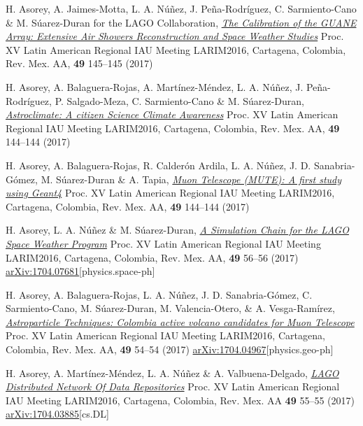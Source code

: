 \begin{etaremune}
\item {} H. Asorey, A. Jaimes-Motta, L. A. Núñez, J. Peña-Rodríguez, C. Sarmiento-Cano \& M. Súarez-Duran for the LAGO Collaboration, \href{http://www.astroscu.unam.mx/rmaa/RMxAC..49/PDF/RMxAC..49\_poster3.pdf}{\emph{The Calibration of the GUANE Array: Extensive Air Showers Reconstruction and Space Weather Studies}} \en Proc. XV Latin American Regional IAU Meeting LARIM2016, Cartagena, Colombia, Rev. Mex. AA, {\bf{49}} 145--145 (2017)

\item {} H. Asorey, A. Balaguera-Rojas, A. Martínez-Méndez, L. A. Núñez, J. Peña-Rodríguez, P. Salgado-Meza, C. Sarmiento-Cano \& M. Súarez-Duran, \href{http://www.astroscu.unam.mx/rmaa/RMxAC..49/PDF/RMxAC..49\_poster2.pdf}{\emph{Astroclimate: A citizen Science Climate Awareness}} \en Proc. XV Latin American Regional IAU Meeting LARIM2016, Cartagena, Colombia, Rev. Mex. AA, {\bf{49}} 144--144 (2017)

\item {} H. Asorey, A. Balaguera-Rojas, R. Calderón Ardila, L. A. Núñez, J. D. Sanabria-Gómez, M. Súarez-Duran \& A. Tapia, \href{http://www.astroscu.unam.mx/rmaa/RMxAC..49/PDF/RMxAC..49\_poster2.pdf}{\emph{Muon Telescope (MUTE): A first study using Geant4}} \en Proc. XV Latin American Regional IAU Meeting LARIM2016, Cartagena, Colombia, Rev. Mex. AA, {\bf{49}} 144--144 (2017)

\item {} H. Asorey, L. A. Núñez \& M. Súarez-Duran, \href{http://www.astroscu.unam.mx/rmaa/RMxAC..49/PDF/RMxAC..49\_oral6.pdf}{\emph{A Simulation Chain for the LAGO Space Weather Program}} \en Proc. XV Latin American Regional IAU Meeting LARIM2016, Cartagena, Colombia, Rev. Mex. AA, {\bf{49}} 56--56 (2017) \href{http://arxiv.org/abs/1704.07681}{arXiv:1704.07681}[physics.space-ph]

\item {} H. Asorey, A. Balaguera-Rojas, L. A. Núñez, J. D. Sanabria-Gómez, C. Sarmiento-Cano, M. Súarez-Duran, M. Valencia-Otero, \& A. Vesga-Ramírez, \href{http://www.astroscu.unam.mx/rmaa/RMxAC..49/PDF/RMxAC..49\_oral4.pdf}{\emph{Astroparticle Techniques: Colombia active volcano candidates for Muon Telescope}} \en Proc. XV Latin American Regional IAU Meeting LARIM2016, Cartagena, Colombia, Rev. Mex. AA, {\bf{49}} 54--54 (2017) \href{http://arxiv.org/abs/1704.04967}{arXiv:1704.04967}[physics.geo-ph]

\item {}H. Asorey, A. Martínez-Méndez, L. A. Núñez \& A. Valbuena-Delgado, \href{http://www.astroscu.unam.mx/rmaa/RMxAC..49/PDF/RMxAC..49\_oral5.pdf}{\emph{LAGO Distributed Network Of Data Repositories}} \en Proc. XV Latin American Regional IAU Meeting LARIM2016, Cartagena, Colombia, Rev. Mex. AA {\bf{49}} 55--55 (2017) \href{http://arxiv.org/abs/1704.03885}{arXiv:1704.03885}[cs.DL]


\end{etaremune}
